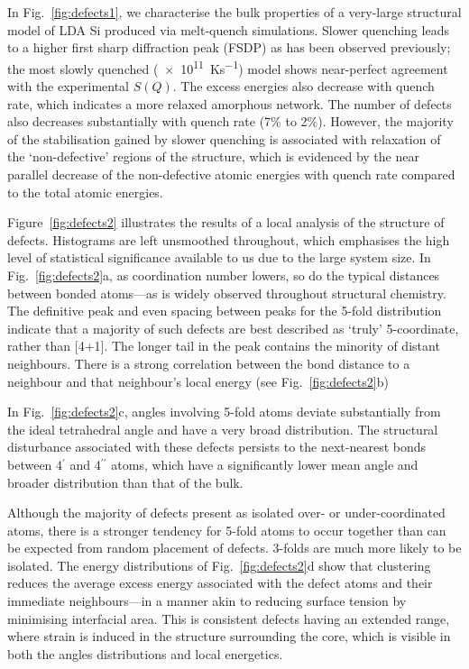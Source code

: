 \documentclass[12pt,a4paper,twoside,nobind]{ociamthesis}
\begin{document}
In Fig.\ \ref{fig:defects1}, we characterise the bulk properties of a very-large structural model of LDA Si produced via melt-quench simulations.
Slower quenching leads to a higher first sharp diffraction peak (FSDP) as has been observed previously;\autocite{Deringer2018d} the most slowly quenched (\SI{e11}{Ks^{-1}}) model shows near-perfect agreement with the experimental $S(Q)$.
The excess energies also decrease with quench rate, which indicates a more relaxed amorphous network. The number of defects also decreases substantially with quench rate (7\% to 2\%).
However, the majority of the stabilisation gained by slower quenching is associated with relaxation of the `non-defective' regions of the structure, 
which is evidenced by the near parallel decrease of the non-defective atomic energies with quench rate compared to the total atomic energies.

Figure\ \ref{fig:defects2} illustrates the results of a local analysis of the structure of defects. 
Histograms are left unsmoothed throughout, which emphasises the high level of statistical significance available to us due to the large system size.
In Fig.\ \ref{fig:defects2}a, as coordination number lowers, so do the typical distances between bonded atoms---as is widely observed throughout structural chemistry.
The definitive  peak and even spacing between peaks for the 5-fold distribution indicate that a majority of such defects are best described as `truly' 5-coordinate, rather than [4+1]. 
The longer tail in the  peak contains the minority of distant  neighbours. 
There is a strong correlation between the bond distance to a neighbour and that neighbour's local energy (see Fig.\ \ref{fig:defects2}b)

In Fig.\ \ref{fig:defects2}c, angles involving 5-fold atoms deviate substantially
from the ideal tetrahedral angle and have a very broad distribution. 
The structural disturbance associated with these defects persists to the next-nearest bonds between 4$^\prime$ and 4$^{\prime\prime}$ atoms, 
which have a significantly lower mean angle and broader distribution than that of the bulk.

Although the majority of defects present as isolated over- or under-coordinated atoms, there is a stronger tendency for 5-fold atoms to occur together than can be expected from random placement of defects.
3-folds are much more likely to be isolated. The energy distributions of Fig.\ \ref{fig:defects2}d show that clustering reduces the average excess energy associated with the defect atoms and their immediate neighbours---in a manner akin to reducing surface tension by minimising interfacial area. This is consistent defects having an extended range, where strain is induced in the structure surrounding the core, which is
visible in both the angles distributions and local energetics.
\end{document}
